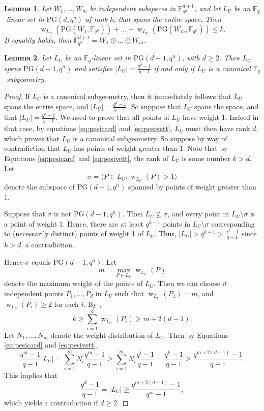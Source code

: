 \documentclass[10pt,a4paper]{amsart}
\newtheorem{lemma}{Lemma}
\newcommand{\PG}{\mathrm{PG}}
\newcommand{\fq}{{\mathbb F}_{q}}
\newcommand{\fqn}{\mathbb{F}_{q^n}}
\newcommand{\pg}{\PG}
\DeclareMathOperator{\ww}{w}
\begin{document}
\begin{lemma}
 \label{lm:IndependentSubspaces}
 Let $W_1, \dots, W_m$ be independent subspaces in $\fqn^{d+1}$, and let $L_U$ be an $\fq$-linear set in $\PG(d,q^n)$ of rank $k$, that spans the entire space.
 Then
 \[
  \ww_{L_U}( \pg(W_1,\fqn)) + \ldots + \ww_{L_U}(\pg(W_m,\fqn)) \leq k.
 \]
 If equality holds, then $\fqn^{d+1} = W_1 \oplus \ldots \oplus W_m$.
\end{lemma}

\begin{lemma}
 \label{lm:subgeometry}
Let $L_U$ be an $\fq$-linear set in $\PG(d-1,q^n)$, with $d \geq 2$.
Then $L_U$ spans $\PG(d-1,q^n)$ and satisfies $|L_U| = \frac{q^d-1}{q-1}$ if and only if $L_U$ is a canonical $\fq$-subgeometry.
\end{lemma}

\begin{proof}
If $L_U$ is a canonical subgeometry, then it immediately follows that $L_U$ spans the entire space, and $|L_U| = \frac{q^d-1}{q-1}$.
So suppose that $L_U$ spans the space, and that $|L_U| = \frac{q^d-1}{q-1}$.
We need to prove that all points of $L_U$ have weight 1.
Indeed in that case, by equations \eqref{eq:pesicard} and \eqref{eq:pesivett}, $L_U$ must then have rank $d$, which proves that $L_U$ is a canonical subgeometry.
So suppose by way of contradiction that $L_U$ has points of weight greater than 1.
Note that by Equations \eqref{eq:pesicard} and \eqref{eq:pesivett}, the rank of $L_U$ is some number $k > d$.
Let
\[
 \sigma = \langle P \in L_U \colon \ww_{L_U}(P) > 1 \rangle
\]
denote the subspace of $\PG(d-1,q^n)$ spanned by points of weight greater than 1.

Suppose that $\sigma$ is not $\PG(d-1,q^n)$. 
Then $L_U \not \subseteq \sigma$, and every point in $L_U \setminus \sigma$ is a point of weight 1.
Hence, there are at least $q^{k-1}$ points in $L_U \setminus \sigma$ corresponding to (necessarily distinct) points of weight 1 of $L_U$.
Thus, $|L_U| > q^{k-1} > \frac{q^d-1}{q-1}$ since $k > d$, a contradiction.

Hence $\sigma$ equals $\PG(d-1,q^n)$.
Let
\[
 m = \max_{P \in L_U} \ww_{L_U}(P)
\]
denote the maximum weight of the points of $L_U$.
Then we can choose $d$ independent points $P_1, \dots, P_d$ in $L_U$ such that $\ww_{L_U}(P_1) = m$, and $\ww_{L_U}(P_i) \geq 2$ for each $i$.
By ,
\[
 k \geq \sum_{i=1}^d \ww_{L_U}(P_i) \geq m + 2(d-1).
\]
Let $N_1,\ldots,N_m$ denote the weight distribution of $L_U$.
Then by Equations \eqref{eq:pesicard} and \eqref{eq:pesivett},
\[
 \frac{q^m-1}{q-1} |L_U| = \sum_{i=1}^m N_i \frac{q^m-1}{q-1}
 \geq \sum_{i=1}^m N_i \frac{q^i-1}{q-1} = \frac{q^k-1}{q-1}
 \geq \frac{q^{m+2(d-1)}-1}{q-1}.
\]
This implies that
\[
  \frac{q^d-1}{q-1} = |L_U| \geq \frac{q^{m+2(d-1)}-1}{q^m-1},
\]
which yields a contradiction if $d \geq 2$.
\end{proof}
\end{document}
